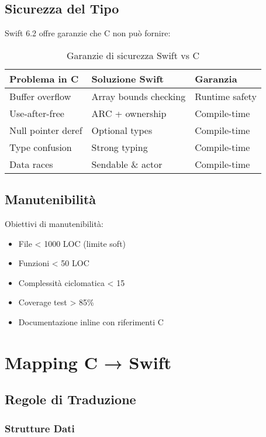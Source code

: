 \subsection{Sicurezza del Tipo}

Swift 6.2 offre garanzie che C non può fornire:

\begin{table}[h]
\centering
\begin{tabular}{@{}lll@{}}
\toprule
\textbf{Problema in C} & \textbf{Soluzione Swift} & \textbf{Garanzia} \\
\midrule
Buffer overflow & Array bounds checking & Runtime safety \\
Use-after-free & ARC + ownership & Compile-time \\
Null pointer deref & Optional types & Compile-time \\
Type confusion & Strong typing & Compile-time \\
Data races & Sendable \& actor & Compile-time \\
\bottomrule
\end{tabular}
\caption{Garanzie di sicurezza Swift vs C}
\label{tab:safety}
\end{table}

\subsection{Manutenibilità}

Obiettivi di manutenibilità:
\begin{itemize}
\item File < 1000 LOC (limite soft)
\item Funzioni < 50 LOC
\item Complessità ciclomatica < 15
\item Coverage test > 85\%
\item Documentazione inline con riferimenti C
\end{itemize}

\section{Mapping C → Swift}

\subsection{Regole di Traduzione}

\subsubsection{Strutture Dati}

